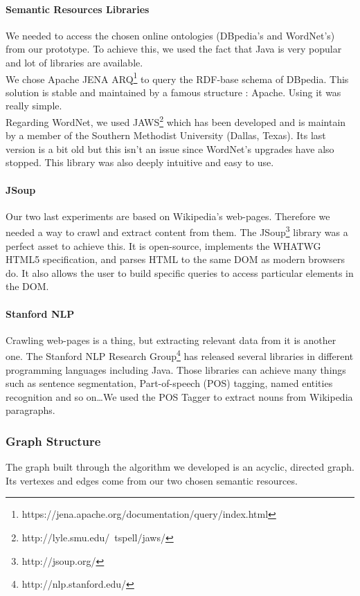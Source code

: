 \paragraph{Semantic Resources Libraries} %
\label{par:semantic_resources_libraries}
We needed to access the chosen online ontologies (DBpedia's and WordNet's) from our prototype. To achieve this, we used the fact that Java is very popular and lot of libraries are available.\\
We chose Apache JENA ARQ\footnote{https://jena.apache.org/documentation/query/index.html} to query the RDF-base schema of DBpedia. This solution is stable and maintained by a famous structure : Apache. Using it was really simple.\\
Regarding WordNet, we used JAWS\footnote{http://lyle.smu.edu/~tspell/jaws/} which has been developed and is maintain by a member of the Southern Methodist University (Dallas, Texas). Its last version is a bit old but this isn't an issue since WordNet's upgrades have also stopped. This library was also deeply intuitive and easy to use.
\paragraph{JSoup} %
\label{par:jsoup}
Our two last experiments are based on Wikipedia's web-pages. Therefore we needed a way to crawl and extract content from them. The JSoup\footnote{http://jsoup.org/} library was a perfect asset to achieve this. It is open-source, implements the WHATWG HTML5 specification, and parses HTML to the same DOM as modern browsers do. It also allows the user to build specific queries to access particular elements in the DOM.
\paragraph{Stanford NLP} %
\label{par:stanford_nlp}
Crawling web-pages is a thing, but extracting relevant data from it is another one. The Stanford NLP Research Group\footnote{http://nlp.stanford.edu/} has released several libraries in different programming languages including Java. Those libraries can achieve many things such as sentence segmentation, Part-of-speech (POS) tagging, named entities recognition and so on\dots We used the POS Tagger to extract nouns from Wikipedia paragraphs.

\subsubsection{Graph Structure} %
\label{ssub:graph_structure}
The graph built through the algorithm we developed is an acyclic, directed graph. Its vertexes and edges come from our two chosen semantic resources.
